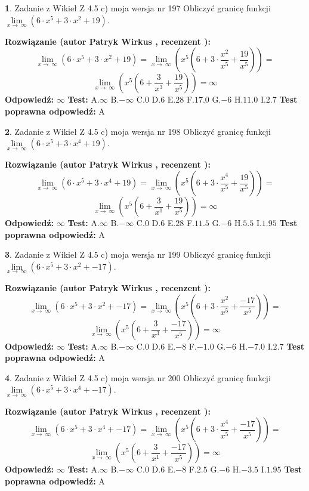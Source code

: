 \documentclass[12pt, a4paper]{article}
\theoremstyle{definition} %
\newtheorem{zad}{}
\newcommand{\zadStart}[1]{\begin{zad}#1\newline}
\newcommand{\zadStop}{\end{zad}}
\newcommand{\rozwStart}[2]{\noindent \textbf{Rozwiązanie (autor #1 , recenzent #2): }\newline}
\newcommand{\rozwStop}{\newline}
\newcommand{\odpStart}{\noindent \textbf{Odpowiedź:}\newline}
\newcommand{\odpStop}{\newline}
\newcommand{\testStart}{\noindent \textbf{Test:}\newline}
\newcommand{\testStop}{\newline}
\newcommand{\kluczStart}{\noindent \textbf{Test poprawna odpowiedź:}\newline}
\newcommand{\kluczStop}{\newline}
\begin{document}
\zadStart{Zadanie z Wikieł Z 4.5 c) moja wersja nr 197}
Obliczyć granicę funkcji  $\lim\limits_{x\to\ \infty}(6 \cdot x^{5}+3 \cdot x^{2}+19)$.
\zadStop
\rozwStart{Patryk Wirkus}{}
$$\lim\limits_{x\to\ \infty}(6 \cdot x^{5}+3 \cdot x^{2}+19) = \lim\limits_{x\to\ \infty}(x^{5}(6 +3 \cdot \frac{x^{2}}{x^{5}}+\frac{19}{x^{5}})) =$$ $$\lim\limits_{x\to\ \infty}(x^{5}(6 +\frac{3}{x^{3}}+\frac{19}{x^{5}})) =\infty$$
\rozwStop
\odpStart
$\infty$
\odpStop
\testStart
A.$\infty$ B.$-\infty$ C.$0$ D.$6$ E.$28$
F.$17.0$ G.$-6$
H.$11.0$
I.$2.7$
\testStop
\kluczStart
A
\kluczStop



\zadStart{Zadanie z Wikieł Z 4.5 c) moja wersja nr 198}
Obliczyć granicę funkcji  $\lim\limits_{x\to\ \infty}(6 \cdot x^{5}+3 \cdot x^{4}+19)$.
\zadStop
\rozwStart{Patryk Wirkus}{}
$$\lim\limits_{x\to\ \infty}(6 \cdot x^{5}+3 \cdot x^{4}+19) = \lim\limits_{x\to\ \infty}(x^{5}(6 +3 \cdot \frac{x^{4}}{x^{5}}+\frac{19}{x^{5}})) =$$ $$\lim\limits_{x\to\ \infty}(x^{5}(6 +\frac{3}{x^{1}}+\frac{19}{x^{5}})) =\infty$$
\rozwStop
\odpStart
$\infty$
\odpStop
\testStart
A.$\infty$ B.$-\infty$ C.$0$ D.$6$ E.$28$
F.$11.5$ G.$-6$
H.$5.5$
I.$1.95$
\testStop
\kluczStart
A
\kluczStop



\zadStart{Zadanie z Wikieł Z 4.5 c) moja wersja nr 199}
Obliczyć granicę funkcji  $\lim\limits_{x\to\ \infty}(6 \cdot x^{5}+3 \cdot x^{2}+-17)$.
\zadStop
\rozwStart{Patryk Wirkus}{}
$$\lim\limits_{x\to\ \infty}(6 \cdot x^{5}+3 \cdot x^{2}+-17) = \lim\limits_{x\to\ \infty}(x^{5}(6 +3 \cdot \frac{x^{2}}{x^{5}}+\frac{-17}{x^{5}})) =$$ $$\lim\limits_{x\to\ \infty}(x^{5}(6 +\frac{3}{x^{3}}+\frac{-17}{x^{5}})) =\infty$$
\rozwStop
\odpStart
$\infty$
\odpStop
\testStart
A.$\infty$ B.$-\infty$ C.$0$ D.$6$ E.$-8$
F.$-1.0$ G.$-6$
H.$-7.0$
I.$2.7$
\testStop
\kluczStart
A
\kluczStop



\zadStart{Zadanie z Wikieł Z 4.5 c) moja wersja nr 200}
Obliczyć granicę funkcji  $\lim\limits_{x\to\ \infty}(6 \cdot x^{5}+3 \cdot x^{4}+-17)$.
\zadStop
\rozwStart{Patryk Wirkus}{}
$$\lim\limits_{x\to\ \infty}(6 \cdot x^{5}+3 \cdot x^{4}+-17) = \lim\limits_{x\to\ \infty}(x^{5}(6 +3 \cdot \frac{x^{4}}{x^{5}}+\frac{-17}{x^{5}})) =$$ $$\lim\limits_{x\to\ \infty}(x^{5}(6 +\frac{3}{x^{1}}+\frac{-17}{x^{5}})) =\infty$$
\rozwStop
\odpStart
$\infty$
\odpStop
\testStart
A.$\infty$ B.$-\infty$ C.$0$ D.$6$ E.$-8$
F.$2.5$ G.$-6$
H.$-3.5$
I.$1.95$
\testStop
\kluczStart
A
\kluczStop
\end{document}
